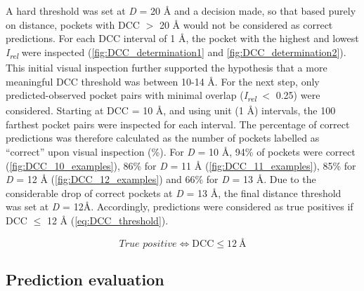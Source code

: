 A hard threshold was set at \textit{D} = 20 \AA{} and a decision made, so that based purely on distance, pockets with DCC $>$ 20 \AA{} would not be considered as correct predictions. For each DCC interval of 1 \AA{}, the pocket with the highest and lowest \textit{I\textsubscript{rel}} were inspected (\autoref{fig:DCC_determination1} and \autoref{fig:DCC_determination2}). This initial visual inspection further supported the hypothesis that a more meaningful DCC threshold was between 10-14 \AA{}. For the next step, only predicted-observed pocket pairs with minimal overlap (\textit{I\textsubscript{rel}} $<$ 0.25) were considered. Starting at DCC = 10 \AA{}, and using unit (1 \AA{}) intervals, the 100 farthest pocket pairs were inspected for each interval. The percentage of correct predictions was therefore calculated as the number of pockets labelled as ``correct'' upon visual inspection (\%). For \textit{D} = 10 \AA{}, 94\% of pockets were correct (\autoref{fig:DCC_10_examples}), 86\% for \textit{D} = 11 \AA{} (\autoref{fig:DCC_11_examples}), 85\% for \textit{D} = 12 \AA{} (\autoref{fig:DCC_12_examples}) and 66\% for \textit{D} = 13 \AA{}. Due to the considerable drop of correct pockets at \textit{D} = 13 \AA{}, the final distance threshold was set at \textit{D} = 12\AA{}. Accordingly, predictions were considered as true positives if DCC $\leq$ 12 \AA{} (\autoref{eq:DCC_threshold}).

\begin{equation}
\textit{True positive} \iff \text{DCC} \leq 12\: \text{\AA{}}
\label{eq:DCC_threshold}
\end{equation}

\vspace{-12pt} %
\vspace{-12pt} %
\vspace{-12pt} %

\subsection{Prediction evaluation}

